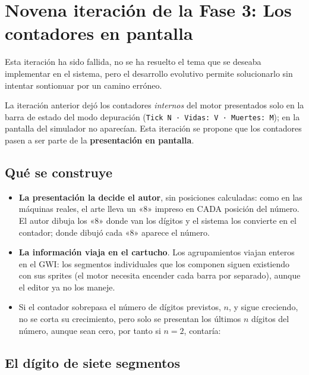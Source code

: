 \section{Novena iteración de la Fase 3: Los contadores en pantalla}
\label{sec:ContadoresPantalla}

Esta iteración ha sido fallida, no se ha resuelto el tema que se deseaba implementar en el sistema, pero el desarrollo evolutivo permite solucionarlo sin intentar sontionuar por un camino erróneo.

La iteración anterior dejó los contadores \emph{internos} del motor presentados
solo en la barra de estado del modo depuración (\texttt{Tick N · Vidas: V · Muertes: M});
en la pantalla del simulador no aparecían. Esta iteración se
propone que los contadores pasen a ser parte de la \textbf{presentación en pantalla}.

\subsection{Qué se construye}
\label{subsec:QueSeConstruyeF3I9}

\begin{itemize}
	\item \textbf{La presentación la decide el autor}, sin posiciones calculadas:
	como en las máquinas reales, el arte lleva un «8» impreso en CADA posición del
	número. El autor dibuja los «8» donde van los dígitos y el sistema los
	convierte en el contador; donde dibujó cada «8» aparece el número.
	
	\item \textbf{La información viaja en el cartucho}. Los agrupamientos viajan
	enteros en el GWI: los segmentos individuales que los componen siguen
	existiendo con sus sprites (el motor necesita encender cada barra por
	separado), aunque el editor ya no los maneje.
	
	\item Si el contador sobrepasa el número de dígitos previstos, $n$, y sigue
	creciendo, no se corta su crecimiento, pero solo se presentan los últimos
	$n$ dígitos del número, aunque sean cero, por tanto si $n=2$, contaría:
	\begin{center}
	\end{center}
\end{itemize}

\subsection{El dígito de siete segmentos}
\label{subsec:SieteSegmentosF3I9}


